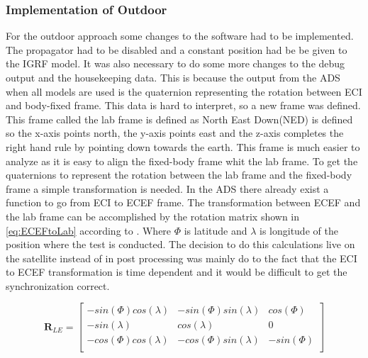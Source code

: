 \subsubsection{Implementation of Outdoor}
For the outdoor approach some changes to the software had to be implemented. The propagator had to be disabled and a constant position had be be given to the IGRF model. It was also necessary to do some more changes to the debug output and the housekeeping data. This is because the output from the ADS when all models are used is the quaternion representing the rotation between ECI and body-fixed frame. This data is hard to interpret, so a new frame was defined. This frame called the lab frame is defined as North East Down(NED) is defined so the x-axis points north, the y-axis points east and the z-axis completes the right hand rule by pointing down towards the earth. This frame is much easier to analyze as it is easy to align the fixed-body frame whit the lab frame. To get the quaternions to represent the rotation between the lab frame and the fixed-body frame a simple transformation is needed. In the ADS there already exist a function to go from ECI to ECEF frame. The transformation between ECEF and the lab frame can be accomplished by the rotation matrix shown in \autoref{eq:ECEFtoLab} according to \cite{UWE-3}. Where $\Phi$ is latitude and $\lambda$ is longitude of the position where the test is conducted. The decision to do this calculations live on the satellite instead of in post processing was mainly do to the fact that the ECI to ECEF transformation is time dependent and it would be difficult to get the synchronization correct.    

\begin{equation}\label{eq:ECEFtoLab}
	\boldsymbol{R}_{LE} = \begin{bmatrix}
		-sin(\Phi)cos(\lambda) & -sin(\Phi)sin(\lambda) & cos(\Phi) \\
		-sin(\lambda) & cos(\lambda) & 0 \\
		-cos(\Phi)cos(\lambda) & -cos(\Phi)sin(\lambda) & -sin(\Phi) \\
	\end{bmatrix}
\end{equation}                       

